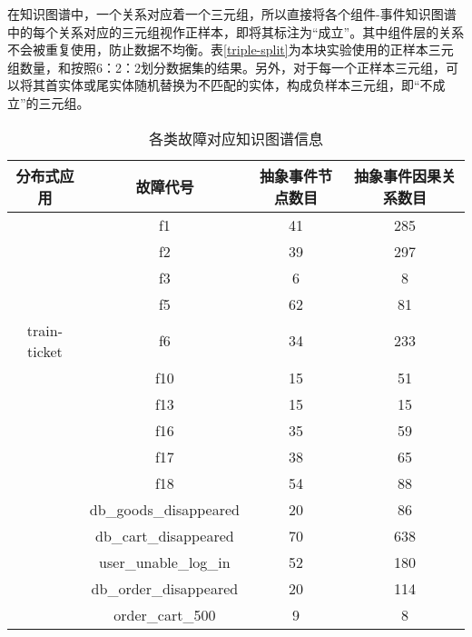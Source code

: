 在知识图谱中，一个关系对应着一个三元组，所以直接将各个组件-事件知识图谱中的每个关系对应的三元组视作正样本，即将其标注为“成立”。其中组件层的关系不会被重复使用，防止数据不均衡。表\ref{triple-split}为本块实验使用的正样本三元组数量，和按照6：2：2划分数据集的结果。另外，对于每一个正样本三元组，可以将其首实体或尾实体随机替换为不匹配的实体，构成负样本三元组，即“不成立”的三元组。

\begin{table}[htbp]
    \caption{各类故障对应知识图谱信息}
    \centering
    \label{kg-abstract-event-num}
    \begin{tabular}{cccc}
    \toprule[1.5pt]
    分布式应用          & 故障代号                                    & 抽象事件节点数目 & 抽象事件因果关系数目 \\ \midrule[1.5pt]
                 & f1                                      & 41       & 285        \\
                 & f2                                      & 39       & 297        \\
                 & f3                                      & 6        & 8          \\
                 & f5                                      & 62       & 81         \\
    train-ticket & f6                                      & 34       & 233        \\
                 & f10                                     & 15       & 51         \\
                 & f13                                     & 15       & 15         \\
                 & f16                                     & 35       & 59         \\
                 & f17                                     & 38       & 65         \\
                 & f18                                     & 54       & 88         \\ \midrule[1pt]
                 & db\_goods\_disappeared                  & 20       & 86         \\
                 & db\_cart\_disappeared                   & 70       & 638        \\
                 & user\_unable\_log\_in                   & 52       & 180        \\
                 & db\_order\_disappeared                  & 20       & 114        \\
                 & order\_cart\_500                        & 9        & 8          \\

\end{tabular}
\end{table}
